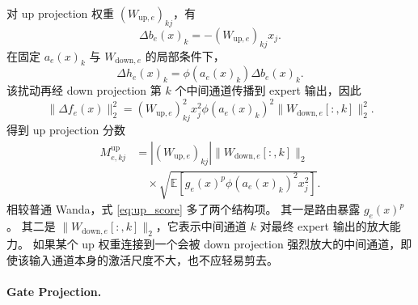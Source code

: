 \documentclass[letterpaper]{article}
\begin{document}
对 up projection 权重 $(W_{\mathrm{up},e})_{kj}$，有
\begin{equation}
    \Delta b_e(x)_k
    =
    -(W_{\mathrm{up},e})_{kj}x_j.
\end{equation}
在固定 $a_e(x)_k$ 与 $W_{\mathrm{down},e}$ 的局部条件下，
\begin{equation}
    \Delta h_e(x)_k
    =
    \phi(a_e(x)_k)\Delta b_e(x)_k.
\end{equation}
该扰动再经 down projection 第 $k$ 个中间通道传播到 expert 输出，因此
\begin{equation}
    \|\Delta f_e(x)\|_2^2
    =
    (W_{\mathrm{up},e})_{kj}^{2}
    x_j^2
    \phi(a_e(x)_k)^2
    \|W_{\mathrm{down},e}[:,k]\|_2^2.
\end{equation}
得到 up projection 分数
\begin{equation}
\begin{aligned}
    M^{\mathrm{up}}_{e,kj}
    &=
    |(W_{\mathrm{up},e})_{kj}|
    \|W_{\mathrm{down},e}[:,k]\|_2 \\
    &\quad \times
    \sqrt{
    \mathbb{E}\!\left[
        g_e(x)^p
        \phi(a_e(x)_k)^2
        x_j^2
    \right]
    }.
\end{aligned}
\label{eq:up_score}
\end{equation}
相较普通 Wanda，式 \eqref{eq:up_score} 多了两个结构项。
其一是路由暴露 $g_e(x)^p$。
其二是 $\|W_{\mathrm{down},e}[:,k]\|_2$，它表示中间通道 $k$ 对最终 expert 输出的放大能力。
如果某个 up 权重连接到一个会被 down projection 强烈放大的中间通道，即使该输入通道本身的激活尺度不大，也不应轻易剪去。

\paragraph{Gate Projection.}
\end{document}
